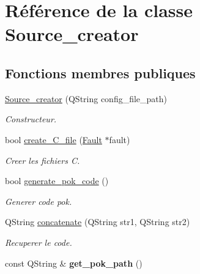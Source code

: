 \hypertarget{classSource__creator}{
\section{Référence de la classe Source\_\-creator}
\label{classSource__creator}
}
\subsection*{Fonctions membres publiques}
\begin{DoxyCompactItemize}
\item 
\hyperlink{classSource__creator_a4daffe7e8125a0fc1a1887d2943d7931}{Source\_\-creator} (QString config\_\-file\_\-path)
\begin{DoxyCompactList}\small\item\em Constructeur. \item\end{DoxyCompactList}\item 
bool \hyperlink{classSource__creator_a447a7cc3a6828404fa592a20fe38e1dd}{create\_\-C\_\-file} (\hyperlink{classFault}{Fault} $\ast$fault)
\begin{DoxyCompactList}\small\item\em Creer les fichiers C. \item\end{DoxyCompactList}\item 
bool \hyperlink{classSource__creator_a4f9996f453ffc97272b736e8e7f7a3c3}{generate\_\-pok\_\-code} ()
\begin{DoxyCompactList}\small\item\em Generer code pok. \item\end{DoxyCompactList}\item 
QString \hyperlink{classSource__creator_af4c03606f98794df555918f3a9fc0183}{concatenate} (QString str1, QString str2)
\begin{DoxyCompactList}\small\item\em Recuperer le code. \item\end{DoxyCompactList}\item 
\hypertarget{classSource__creator_a0e5520c2dc6809fb21903a026308be6a}{
const QString \& {\bfseries get\_\-pok\_\-path} ()}
\label{classSource__creator_a0e5520c2dc6809fb21903a026308be6a}

\end{DoxyCompactItemize}



